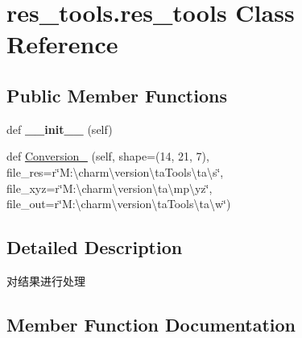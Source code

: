 \hypertarget{classres__tools_1_1res__tools}{}\section{res\+\_\+tools.\+res\+\_\+tools Class Reference}
\label{classres__tools_1_1res__tools}
\subsection*{Public Member Functions}
\begin{DoxyCompactItemize}
\item 
\mbox{\label{classres__tools_1_1res__tools_a20e3dc1ef533d1d9fa782d7bb9f46be6}} 
def {\bfseries \+\_\+\+\_\+init\+\_\+\+\_\+} (self)
\item 
def \hyperlink{classres__tools_1_1res__tools_ab463e678df54460979cbde7e71071cf6}{Conversion\+\_} (self, shape=(14, 21, 7), file\+\_\+res=r\char`\"{}M\+:\textbackslash{}charm\textbackslash{}version\textbackslash{}ta\+Tools\textbackslash{}ta\textbackslash{}s\char`\"{}, file\+\_\+xyz=r\char`\"{}M\+:\textbackslash{}charm\textbackslash{}version\textbackslash{}ta\textbackslash{}mp\textbackslash{}yz\char`\"{}, file\+\_\+out=r\char`\"{}M\+:\textbackslash{}charm\textbackslash{}version\textbackslash{}ta\+Tools\textbackslash{}ta\textbackslash{}w\char`\"{})
\end{DoxyCompactItemize}


\subsection{Detailed Description}
\begin{DoxyVerb}对结果进行处理\end{DoxyVerb}
 

\subsection{Member Function Documentation}
\mbox{\label{classres__tools_1_1res__tools_ab463e678df54460979cbde7e71071cf6}} 
